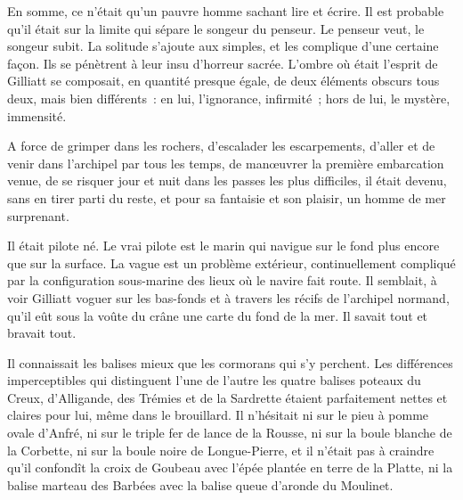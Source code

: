 \documentclass[french,twoside]{book} %
\begin{document}
En somme, ce n’était qu’un pauvre homme sachant lire et écrire. Il est probable qu’il était sur la limite qui sépare le songeur du penseur. Le penseur veut, le songeur subit. La solitude s’ajoute aux simples, et les complique d’une certaine façon. Ils se pénètrent à leur insu d’horreur sacrée. L’ombre où était l’esprit de Gilliatt se composait, en quantité presque égale, de  deux éléments obscurs tous deux, mais bien différents : en lui, l’ignorance, infirmité ; hors de lui, le mystère, immensité.\par
A force de grimper dans les rochers, d’escalader les escarpements, d’aller et de venir dans l’archipel par tous les temps, de manœuvrer la première embarcation venue, de se risquer jour et nuit dans les passes les plus difficiles, il était devenu, sans en tirer parti du reste, et pour sa fantaisie et son plaisir, un homme de mer surprenant.\par
Il était pilote né. Le vrai pilote est le marin qui navigue sur le fond plus encore que sur la surface. La vague est un problème extérieur, continuellement compliqué par la configuration sous-marine des lieux où le navire fait route. Il semblait, à voir Gilliatt voguer sur les bas-fonds et à travers les récifs de l’archipel normand, qu’il eût sous la voûte du crâne une carte du fond de la mer. Il savait tout et bravait tout.\par
Il connaissait les balises mieux que les cormorans qui s’y perchent. Les différences imperceptibles qui distinguent l’une de l’autre les quatre balises poteaux du Creux, d’Alligande, des Trémies et de la Sardrette étaient parfaitement nettes et claires pour lui, même dans le brouillard. Il n’hésitait ni sur le pieu à pomme ovale d’Anfré, ni sur le triple fer de lance de la Rousse, ni sur la boule blanche de la Corbette, ni sur la boule noire de Longue-Pierre, et il n’était pas à craindre qu’il confondît la croix de Goubeau avec l’épée plantée en terre de la Platte, ni la balise marteau des Barbées avec la balise queue d’aronde du Moulinet.\par
\end{document}
